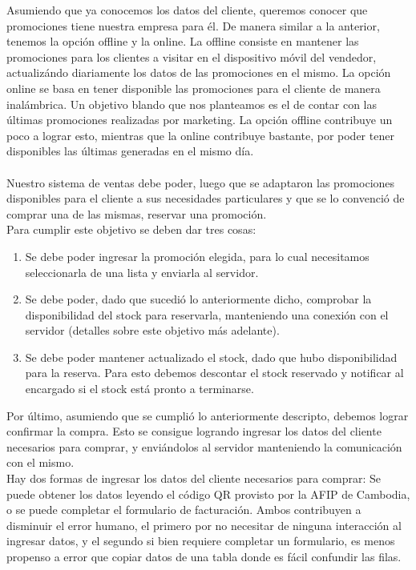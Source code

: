 \indent Asumiendo que ya conocemos los datos del cliente, queremos conocer que promociones tiene nuestra empresa para él. De manera similar a la anterior, tenemos la opción offline y la online. La offline consiste en mantener las promociones para los clientes a visitar en el dispositivo móvil del vendedor, actualizándo diariamente los datos de las promociones en el mismo. La opción online se basa en tener disponible las promociones para el cliente de manera inalámbrica. Un objetivo blando que nos planteamos es el de contar con las últimas promociones realizadas por marketing. La opción offline contribuye un poco a lograr esto, mientras que la online contribuye bastante, por poder tener disponibles las últimas generadas en el mismo día.\\
\\


\indent Nuestro sistema de ventas debe poder, luego que se adaptaron las promociones disponibles para el cliente a sus necesidades particulares y que se lo convenció de comprar una de las mismas, reservar una promoción.\\
\indent Para cumplir este objetivo se deben dar tres cosas:
\begin{enumerate}
  \item Se debe poder ingresar la promoción elegida, para lo cual necesitamos seleccionarla de una lista y enviarla al servidor.
  \item Se debe poder, dado que sucedió lo anteriormente dicho, comprobar la disponibilidad del stock para reservarla, manteniendo una conexión con el servidor (detalles sobre este objetivo más adelante).
  \item Se debe poder mantener actualizado el stock, dado que hubo disponibilidad para la reserva. Para esto debemos descontar el stock reservado y notificar al encargado si el stock está pronto a terminarse.
\end{enumerate}

\indent Por último, asumiendo que se cumplió lo anteriormente descripto, debemos lograr confirmar la compra. Esto se consigue logrando ingresar los datos del cliente necesarios para comprar, y enviándolos al servidor manteniendo la comunicación con el mismo.\\
\indent Hay dos formas de ingresar los datos del cliente necesarios para comprar: Se puede obtener los datos leyendo el código QR provisto por la AFIP de Cambodia, o se puede completar el formulario de facturación. Ambos contribuyen a disminuir el error humano, el primero por no necesitar de ninguna interacción al ingresar datos, y el segundo si bien requiere completar un formulario, es menos propenso a error que copiar datos de una tabla donde es fácil confundir las filas.\\

